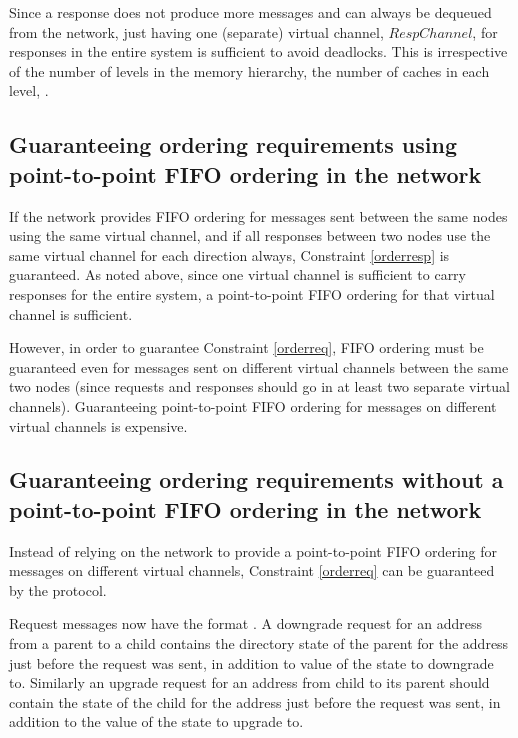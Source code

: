 Since a response does not produce more messages and can always be dequeued from
the network, just having one (separate) virtual channel, $RespChannel$, for
responses in the entire system is sufficient to avoid deadlocks. This is
irrespective of the number of levels in the memory hierarchy, the number of
caches in each level, \etc.

\subsection{Guaranteeing ordering requirements using point-to-point FIFO
ordering in the network}

If the network provides FIFO ordering for messages sent between the same nodes
using the same virtual channel, and if all responses between two nodes use the
same virtual channel for each direction always, Constraint \ref{orderresp} is
guaranteed. As noted above, since one virtual channel is sufficient to carry
responses for the entire system, a point-to-point FIFO ordering for that
virtual channel is sufficient.
 
However, in order to guarantee Constraint \ref{orderreq}, FIFO ordering must be
guaranteed even for messages sent on different virtual channels between the
same two nodes (since requests and responses should go in at least two separate
virtual channels). Guaranteeing point-to-point FIFO ordering for messages on
different virtual channels is expensive.

\subsection{Guaranteeing ordering requirements without a point-to-point FIFO
ordering in the network}
\label{sec:nofifoorder}

Instead of relying on the network to provide a point-to-point FIFO ordering for
messages on different virtual channels, Constraint \ref{orderreq} can be
guaranteed by the protocol.

Request messages now have the format .
A downgrade request for an address from a parent to a child contains the
directory state of the parent for the address just before the request was sent,
in addition to value of the state to downgrade to. Similarly an upgrade request
for an address from child to its parent should contain the state of the child
for the address just before the request was sent, in addition to the value of
the state to upgrade to.

